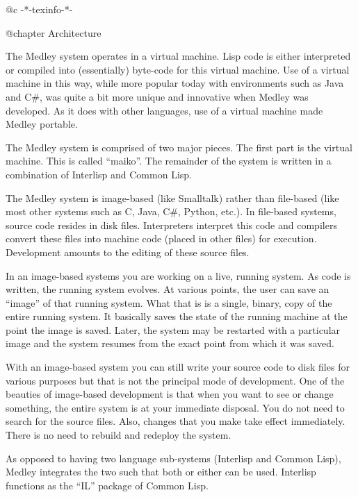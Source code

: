 @c -*-texinfo-*-

@chapter Architecture

The Medley system operates in a virtual machine.  Lisp code is either
interpreted or compiled into (essentially) byte-code for this virtual
machine.  Use of a virtual machine in this way, while more popular
today with environments such as Java and C#, was quite a bit more
unique and innovative when Medley was developed.  As it does with
other languages, use of a virtual machine made Medley portable.

The Medley system is comprised of two major pieces.  The first part is
the virtual machine.  This is called ``maiko''.  The remainder of the
system is written in a combination of Interlisp and Common Lisp.

The Medley system is image-based (like Smalltalk) rather than
file-based (like most other systems such as C, Java, C#, Python,
etc.).  In file-based systems, source code resides in disk files.
Interpreters interpret this code and compilers convert these files
into machine code (placed in other files) for execution.  Development
amounts to the editing of these source files.

In an image-based systems you are working on a live, running system.
As code is written, the running system evolves.  At various points,
the user can save an ``image'' of that running system.  What that is
is a single, binary, copy of the entire running system.  It basically
saves the state of the running machine at the point the image is
saved.  Later, the system may be restarted with a particular image
and the system resumes from the exact point from which it was saved.

With an image-based system you can still write your source code to
disk files for various purposes but that is not the principal mode of
development.  One of the beauties of image-based development is that
when you want to see or change something, the entire system is at your
immediate disposal.  You do not need to search for the source files.
Also, changes that you make take effect immediately.  There is no need
to rebuild and redeploy the system.

As opposed to having two language sub-systems (Interlisp and Common
Lisp), Medley integrates the two such that both or either can be used.
Interlisp functions as the ``IL'' package of Common Lisp.



